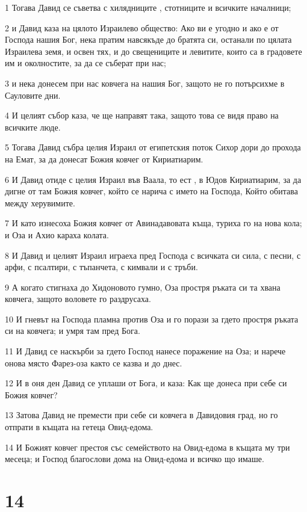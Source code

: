 \par 1 Тогава Давид се съветва с хилядниците , стотниците и всичките началници;
\par 2 и Давид каза на цялото Израилево общество: Ако ви е угодно и ако е от Господа нашия Бог, нека пратим навсякъде до братята си, останали по цялата Израилева земя, и освен тях, и до свещениците и левитите, които са в градовете им и околностите, за да се съберат при нас;
\par 3 и нека донесем при нас ковчега на нашия Бог, защото не го потърсихме в Сауловите дни.
\par 4 И целият събор каза, че ще направят така, защото това се видя право на всичките люде.
\par 5 Тогава Давид събра целия Израил от египетския поток Сихор дори до прохода на Емат, за да донесат Божия ковчег от Кириатиарим.
\par 6 И Давид отиде с целия Израил във Ваала, то ест , в Юдов Кириатиарим, за да дигне от там Божия ковчег, който се нарича с името на Господа, Който обитава между херувимите.
\par 7 И като изнесоха Божия ковчег от Авинадавовата къща, туриха го на нова кола; и Оза и Ахио караха колата.
\par 8 И Давид и целият Израил играеха пред Господа с всичката си сила, с песни, с арфи, с псалтири, с тъпанчета, с кимвали и с тръби.
\par 9 А когато стигнаха до Хидоновото гумно, Оза простря ръката си та хвана ковчега, защото воловете го раздрусаха.
\par 10 И гневът на Господа пламна против Оза и го порази за гдето простря ръката си на ковчега; и умря там пред Бога.
\par 11 И Давид се наскърби за гдето Господ нанесе поражение на Оза; и нарече онова място Фарез-оза както се казва и до днес.
\par 12 И в оня ден Давид се уплаши от Бога, и каза: Как ще донеса при себе си Божия ковчег?
\par 13 Затова Давид не премести при себе си ковчега в Давидовия град, но го отпрати в къщата на гетеца Овид-едома.
\par 14 И Божият ковчег престоя със семейството на Овид-едома в къщата му три месеца; и Господ благослови дома на Овид-едома и всичко що имаше.

\chapter{14}

